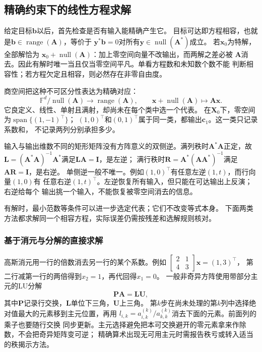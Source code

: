 \subsection{精确约束下的线性方程求解}
\label{sec:linear-algebra-exact-systems}

给定目标$\bm b$以后，首先检查是否有输入能精确产生它。
目标可达即方程相容，也就是$\bm b\in\operatorname{range}(\bm A)$，等价于
$\bm y^*\bm b=0$对所有$\bm y\in\operatorname{null}(\bm A^*)$成立。
若$\bm x_0$为特解，全部解恰为
$\bm x_0+\operatorname{null}(\bm A)$：加上零空间向量不改输出，而两解之差必被
$\bm A$消去。因此有解时唯一当且仅当零空间平凡。单看方程数和未知数个数不能
判断相容性；若方程欠定且相容，则必然存在非零自由度。

商空间把这种不可区分性表达为精确对应：
\[
 \mathbb F^d/\operatorname{null}(\bm A)
 \longrightarrow\operatorname{range}(\bm A),\qquad
 \bm x+\operatorname{null}(\bm A)\longmapsto\bm A\bm x.
\]
它良定义、线性、单射且满射，却尚未在每个类中选一个代表。
在$\bm X_0$下，零空间为$\operatorname{span}\{(1,-1)^\top\}$；
$(1,0)^\top$和$(0,1)^\top$属于同一类，都输出$\bm c_1$。这一类只记录系数和，
不记录两列分别承担多少。


输入与输出维数不同的矩形矩阵没有方阵意义的双侧逆。满列秩时$\bm A^*\bm A$正定，故
$\bm L=(\bm A^*\bm A)^{-1}\bm A^*$满足$\bm L\bm A=\bm I$，是左逆；
满行秩时$\bm R=\bm A^*(\bm A\bm A^*)^{-1}$满足$\bm A\bm R=\bm I$，是右逆。
单侧逆一般不唯一。例如$(1,0)^\top$有任意左逆$(1,t)$，而行向量$(1,0)$有
任意右逆$(1,t)^\top$。左逆恢复所有输入，但只能在可达输出上反演；右逆给每个
输出挑一个输入，不能恢复被零空间消去的信息。


有解时，最小范数等条件可以进一步选定代表；它们不改变等式本身。
下面两类方法都求解同一个相容方程，实际误差仍需按残差和选解规则核对。

\subsubsection{基于消元与分解的直接求解}
\label{sec:linear-algebra-direct-exact}
\label{sec:matrix-analysis-stable-solvers}

\label{sec:matrix-analysis-blocks-updates}


高斯消元用一行的倍数消去另一行的某个系数。例如
$\left[\begin{smallmatrix}2&1\\4&3\end{smallmatrix}\right]\bm x=(1,3)^\top$，
第二行减第一行的两倍得到$x_2=1$，再代回得$x_1=0$。
一般非奇异方阵使用带部分主元的LU分解
\begin{equation}
 \bm P\bm A=\bm L\bm U,
 \label{eq:matrix-analysis-palu}
\end{equation}
其中$\bm P$记录行交换，$\bm L$单位下三角，$\bm U$上三角。
第$k$步在尚未处理的第$k$列中选择绝对值最大的元素移到主元位置，再用
$l_{i,k}=a^{(k)}_{i,k}/a^{(k)}_{k,k}$消去下面的元素。前面列的乘子也要随行交换
同步更新。主元选择避免把本可交换避开的零元素拿来作除数，不会把奇异矩阵变可逆；
精确算术出现无可用主元时需报告秩亏或转入适当的秩揭示方法。

